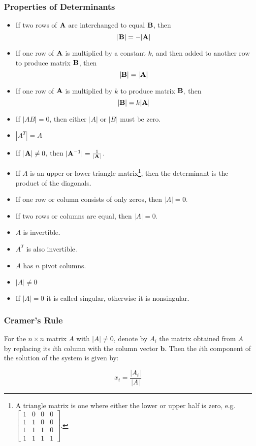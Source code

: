         \subsubsection{Properties of Determinants}
        \begin{itemize}
        \item If two rows of $\mathbf{A}$ are interchanged to equal $\mathbf{B}$, then
            \[ | \mathbf{B} | = - | \mathbf{A} | \]
        \item If one row of $\mathbf{A}$ is multiplied by a constant $k$, and then added to another row to produce matrix $\mathbf{B}$, then
            \[ | \mathbf{B} | = | \mathbf{A} | \]
        \item If one row of $\mathbf{A}$ is multiplied by $k$ to produce matrix $\mathbf{B}$, then
            \[ | \mathbf{B} | = k | \mathbf{A} | \]
        \item If $|AB| = 0$, then either $|A|$ or $|B|$ must be zero.
        \item $|A^T| = A$
        \item If $| \mathbf{A} | \neq 0$, then $| \mathbf{A}^{-1} | = \frac{1}{|\mathbf{A} |}$.
        \item If $A$ is an upper or lower triangle matrix\footnote{A triangle matrix is one where either the lower or upper half is zero, e.g. $\left[\begin{array}{cccc}1 & 0 & 0 & 0\\1 & 1 & 0 & 0\\1 & 1 & 1 & 0\\1 & 1 & 1 & 1\end{array}\right]$.}, then the determinant is the product of the diagonals.
        \item If one row or column consists of only zeros, then $|A| = 0$.
        \item If two rows or columns are equal, then $|A|=0$.
        \item $A$ is invertible.
        \item $A^T$ is also invertible.
        \item $A$ has $n$ pivot columns.
        \item $|A| \neq 0$
        \item If $|A| = 0$ it is called singular, otherwise it is nonsingular.
        \end{itemize}

        \subsubsection{Cramer's Rule}
        For the $n \times n$ matrix $A$ with $|A| \neq 0$, denote by $A_i$ the matrix obtained from $A$ by replacing its $i$th column with the column vector $\mathbf{b}$. Then the $i$th component of the solution of the system is given by:

        \begin{equation}\label{eq:cramer}
            x_i = \frac{|A_i|}{|A|}
        \end{equation}



